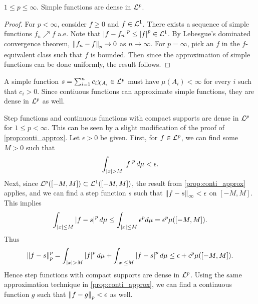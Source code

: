 \begin{theorem}\label{thm:simple_dense}
    $1\leq p\leq \infty$. Simple functions are dense in $\mathcal{L}^p$.
\end{theorem}
\begin{proof}
    For $p<\infty$, consider $f\geq 0$ and $f\in\mathcal{L}^1$. There exists a 
    sequence of simple functions $f_n\nearrow f$ a.e. Note that 
    $\left\lvert {f-f_n} \right\rvert^p\leq\left\lvert {f} \right\rvert^p\in\mathcal{L}^1$. By Lebesgue's dominated 
    convergence theorem, $\left\lVert {f_n-f} \right\rVert_p\to 0$ as $n\to\infty$. 
    For $p=\infty$, pick an $f$ in the $f$-equivalent class 
    such that $f$ is bounded. Then since the approximation of 
    simple functions can be done uniformly, the result follows.
\end{proof}
\begin{remark}
    A simple function $s = \sum_{i=1}^n c_i\chi_{A_i}\in\mathcal{L}^p$ must have 
    $\mu(A_i)<\infty$ for every $i$ such that $c_i > 0$. Since 
    contiuous functions can approximate simple functions, 
    they are dense in $\mathcal{L}^p$ as well.
\end{remark}
\begin{remark}
    Step functions and continuous functions with compact supports are 
    dense in $\mathcal{L}^p$ for $1\leq p<\infty$. This can be seen by a slight 
    modification of the proof of \cref{prop:conti_approx}. Let $\epsilon>0$ 
    be given. First, for $f\in\mathcal{L}^p$, we can find some $M>0$ such that 
    \begin{equation*}
        \int_{\left\lvert {x} \right\rvert>M} \left\lvert {f} \right\rvert^pd\mu < \epsilon.
    \end{equation*}
    Next, since $\mathcal{L}^p([-M,M])\subset\mathcal{L}^1([-M,M])$, the result from 
    \cref{prop:conti_approx} applies, and we can find a step function 
    $s$ such that $\left\lVert {f-s} \right\rVert_\infty < \epsilon$ on $[-M,M]$. This 
    implies 
    \begin{equation*}
        \int_{\left\lvert {x} \right\rvert\leq M} \left\lvert {f-s} \right\rvert^pd\mu 
        \leq \int_{\left\lvert {x} \right\rvert\leq M} \epsilon^pd\mu = \epsilon^p\mu([-M,M]).
    \end{equation*}
    Thus 
    \begin{equation*}
        \left\lVert {f-s} \right\rVert_p^p = \int_{\left\lvert {x} \right\rvert>M} \left\lvert {f} \right\rvert^pd\mu + \int_{\left\lvert {x} \right\rvert\leq M} \left\lvert {f-s} \right\rvert^pd\mu 
        \leq \epsilon + \epsilon^p\mu([-M,M]).
    \end{equation*}
    Hence step functions with compact supports are dense in $\mathcal{L}^p$. Using 
    the same approximation technique in \cref{prop:conti_approx}, we can 
    find a continuous function $g$ such that $\left\lVert {f-g} \right\rVert_p < \epsilon$ 
    as well.
\end{remark}

